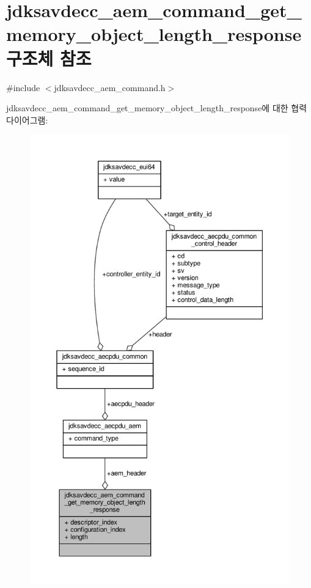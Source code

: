 \hypertarget{structjdksavdecc__aem__command__get__memory__object__length__response}{}\section{jdksavdecc\+\_\+aem\+\_\+command\+\_\+get\+\_\+memory\+\_\+object\+\_\+length\+\_\+response 구조체 참조}
\label{structjdksavdecc__aem__command__get__memory__object__length__response}


{\ttfamily \#include $<$jdksavdecc\+\_\+aem\+\_\+command.\+h$>$}



jdksavdecc\+\_\+aem\+\_\+command\+\_\+get\+\_\+memory\+\_\+object\+\_\+length\+\_\+response에 대한 협력 다이어그램\+:
\nopagebreak
\begin{figure}[H]
\begin{center}
\leavevmode
\includegraphics[height=550pt]{structjdksavdecc__aem__command__get__memory__object__length__response__coll__graph}
\end{center}
\end{figure}
